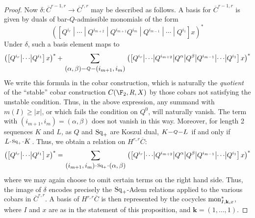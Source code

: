 \documentclass[10pt]{article}
\makeatletter
\newcommand{\produces}[3]{{#1}{#3}{#2}}
\renewcommand{\Q}{Q}
\newcommand{\SqShift}{\Sq_{\smash{+}}}
\newcommand{\Sq}{\mathrm{Sq}}
\newcommand{\DyerLashov}{R}
\newcommand{\minDim}{m}
\newcommand{\BarMonomial}[3]{\textup{mon}_{#1,#2,#3}}
\renewcommand{\produces}[3]{
{
\def\labelstyle{\scriptstyle}
\xymatrix@C=2em@1{
{#1}
\ar@{-}[r]|-{{\,#3\,}}
&%
{#2}%
}}}
\makeatother
\begin{document}
\begin{KoszulComplexes_n>1}
\begin{proof}
Now $\delta:\overline{C}^{r-1,r}\to\overline{C}^{r,r}$ may be described as follows. A basis for $\overline{C}^{r-1,r}$ is given by duals of bar-$\Q$-admissible monomials of the form
\[\left(\left[\Q^{i_r}\middle|\cdots\middle|\Q^{i_{m+2}}  \middle|\Q^{i_{m+1}}\Q^{i_m}\middle|\Q^{i_{m-1}}\middle|\cdots \middle|\Q^{i_1} \right]x\right)^*\]
Under $\delta$, such a basis element maps to
\[
\left(\left[\Q^{i_r}\middle|\cdots \middle|\Q^{i_1} \right]x\right)^*
+
\sum_{\produces{(\alpha,\beta)}{(i_{m+1},i_m)}{\Q}}\left(\left[\Q^{i_r}\middle|\cdots\middle|\Q^{i_{m+2}}  \middle|\Q^{\alpha}\middle|\Q^{\beta}\middle|\Q^{i_{m-1}}\middle|\cdots \middle|\Q^{i_1} \right]x\right)^*\]
We write this formula in the cobar construction, which is naturally the \emph{quotient} of the ``stable'' cobar construction $C(\F_2,\DyerLashov,X)$ by those cobars not satisfying the unstable condition. Thus, in the above expression, any summand with $\minDim(I)\geq|x|$, or which fails the condition on $\Q^0$, will naturally vanish.
%
The term with $(i_{m+1},i_m)=(\alpha,\beta)$ does not vanish in this way. Moreover, for length 2 sequences $K$ and $L$, as $\Q$ and $\SqShift$ are Koszul dual, $\produces{K}{L}{\Q}$ if and only if $\produces{L}{K}{\SqShift}$. Thus, we obtain a relation on $H^{r,r}\overline{C}$:
\[\left(\left[\Q^{i_r}\middle|\cdots \middle|\Q^{i_1} \right]x\right)^*
=
\sum_{\produces{(i_{m+1},i_m)}{(\alpha,\beta)}{\SqShift}}\left(\left[\Q^{i_r}\middle|\cdots\middle|\Q^{i_{m+2}}  \middle|\Q^{\alpha}\middle|\Q^{\beta}\middle|\Q^{i_{m-1}}\middle|\cdots \middle|\Q^{i_1} \right]x\right)^*\]
where we may again choose to omit certain terms on the right hand side. Thus, the image of $\delta$ encodes precisely the $\SqShift$-Adem relations applied to the various cobars in $\overline{C}^{r,r}$. %
A basis of $H^{r,r}\overline{C}$ is then represented by the cocycles $\BarMonomial{I}{\textbf{k}}{x}^*$, where $I$ and $x$ are as in the statement of this proposition, and $\textbf{k}=(1,\ldots,1)$.


\end{proof}
\end{KoszulComplexes_n>1}
\end{document}
